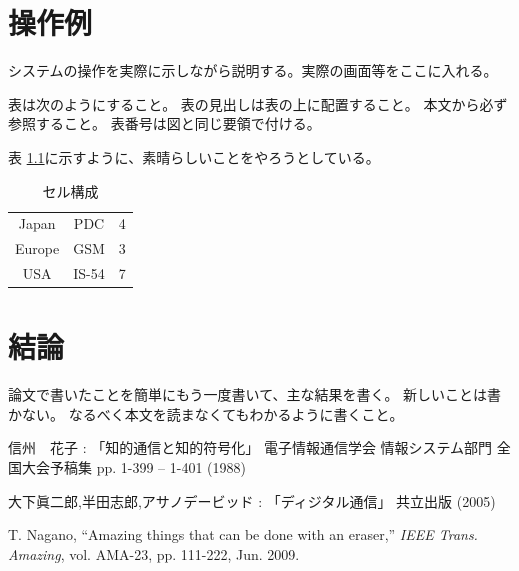 \documentclass[12pt]{jreport}
\begin{document}
\chapter{操作例}
システムの操作を実際に示しながら説明する。実際の画面等をここに入れる。

表は次のようにすること。
表の見出しは表の上に配置すること。
本文から必ず参照すること。
表番号は図と同じ要領で付ける。

表 \ref{tab:c1}に示すように、素晴らしいことをやろうとしている。

\begin{table}[htb]
    \caption{セル構成
        \label{tab:c1}
    }
    \begin{center}
        \begin{tabular}{ccc}
            \hline
            Japan  & PDC   & 4 \\
            Europe & GSM   & 3 \\
            USA    & IS-54 & 7 \\
            \hline
        \end{tabular}
    \end{center}
\end{table}

\chapter{結論}
論文で書いたことを簡単にもう一度書いて、主な結果を書く。
新しいことは書かない。
なるべく本文を読まなくてもわかるように書くこと。


\bunken
\begin{thebibliography}{99}
    信州　花子 : 「知的通信と知的符号化」
    電子情報通信学会 情報システム部門 全国大会予稿集
    pp. 1-399 -- 1-401 (1988)

    大下眞二郎,半田志郎,アサノデービッド : 「ディジタル通信」 共立出版 (2005)

    T. Nagano, ``Amazing things that can be done with an eraser,''
    \emph{IEEE Trans. Amazing}, vol. AMA-23, pp. 111-222, Jun. 2009.
\end{thebibliography}
\end{document}
